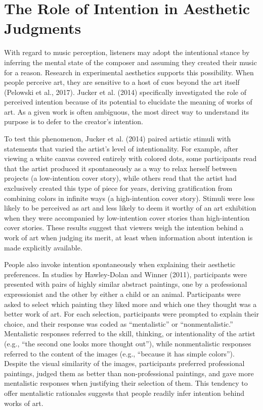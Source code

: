 \documentclass[12pt,twoside]{reedthesis}
\begin{document}
\section*{The Role of Intention in Aesthetic Judgments
}
With regard to music perception, listeners may adopt the intentional stance by inferring the mental state of the composer and assuming they created their music for a reason. Research in experimental aesthetics supports this possibility. When people perceive art, they are sensitive to a host of cues beyond the art itself (Pelowski et al., 2017). Jucker et al. (2014) specifically investigated the role of perceived intention because of its potential to elucidate the meaning of works of art. As a given work is often ambiguous, the most direct way to understand its purpose is to defer to the creator’s intention. 

To test this phenomenon, Jucker et al. (2014) paired artistic stimuli with statements that varied the artist’s level of intentionality. For example, after viewing a white canvas covered entirely with colored dots, some participants read that the artist produced it spontaneously as a way to relax herself between projects (a low-intention cover story), while others read that the artist had exclusively created this type of piece for years, deriving gratification from combining colors in infinite ways (a high-intention cover story). Stimuli were less likely to be perceived as art and less likely to deem it worthy of an art exhibition when they were accompanied by low-intention cover stories than high-intention cover stories. These results suggest that viewers weigh the intention behind a work of art when judging its merit, at least when information about intention is made explicitly available. 

People also invoke intention spontaneously when explaining their aesthetic preferences. In studies by Hawley-Dolan and Winner (2011), participants were presented with pairs of highly similar abstract paintings, one by a professional expressionist and the other by either a child or an animal. Participants were asked to select which painting they liked more and which one they thought was a better work of art. For each selection, participants were prompted to explain their choice, and their response was coded as “mentalistic” or “nonmentalistic.” Mentalistic responses referred to the skill, thinking, or intentionality of the artist (e.g., “the second one looks more thought out”), while nonmentalistic responses referred to the content of the images (e.g., “because it has simple colors”). Despite the visual similarity of the images, participants preferred professional paintings, judged them as better than non-professional paintings, and gave more mentalistic responses when justifying their selection of them. This tendency to offer mentalistic rationales suggests that people readily infer intention behind works of art. 
\end{document}
